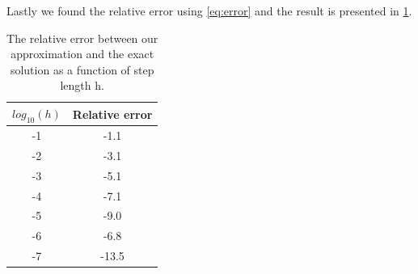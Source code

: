 \documentclass[12pt,a4paper]{article}
\begin{document}
Lastly we found the relative error using \eqref{eq:error} and the result is presented in \ref{tab:error}.
\begin{table}[H]
\centering
\begin{tabular}{|c|c|} \hline
$log_{10}(h)$ & Relative error \\ \hline
-1 & -1.1 \\ \hline
-2 & -3.1 \\ \hline
-3 & -5.1 \\ \hline
-4 & -7.1 \\ \hline
-5 & -9.0 \\ \hline
-6 & -6.8 \\ \hline
-7 & -13.5  \\ \hline
\end{tabular}
\caption{The relative error between our approximation and the exact solution as a function of step length h.}
\label{tab:error}
\end{table}
\end{document}

